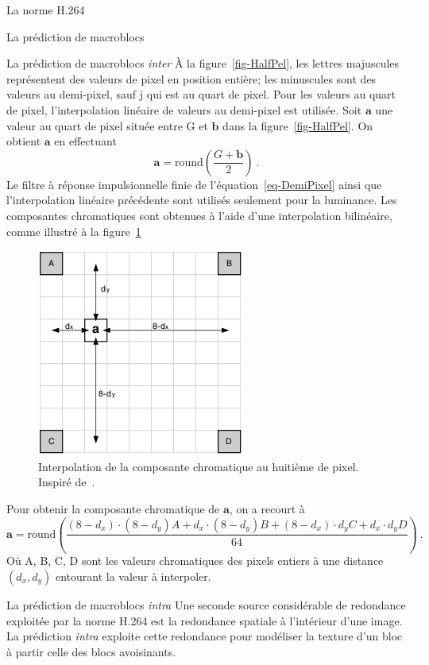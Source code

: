 \documentclass[letterpaper, twoside, 12pt,memoire]{thETS}
\newcommand{\fig}[1]{figure~\ref{#1}}
\begin{document}
\begin{chapter}{La norme H.264}
\begin{section}{La prédiction de macroblocs}
\begin{subsection}{La prédiction de macroblocs \textit{inter}}
À la figure~\ref{fig-HalfPel}, les lettres majuscules représentent des valeurs
de pixel en position entière; les minuscules sont des valeurs au demi-pixel,
sauf j qui est au quart de pixel. Pour les valeurs au quart de pixel,
l'interpolation linéaire de valeurs au demi-pixel est utilisée. Soit $\mathbf{a}$ une valeur au quart de
pixel située entre G et $\mathbf{b}$ dans la \fig{fig-HalfPel}. On obtient
$\mathbf{a}$ en effectuant
\begin{equation}
\mathbf{a} = \text{round} \left(\frac{G + \mathbf{b} }{2} \right)\:.
\end{equation}
Le filtre à réponse impulsionnelle finie de l'équation~\ref{eq-DemiPixel} ainsi
que l'interpolation linéaire précédente sont utilisés seulement pour la
luminance. Les composantes chromatiques sont obtenues à l'aide d'une
interpolation bilinéaire, comme illustré à la figure~\ref{fig-ChromaPel}

\begin{figure}[htb]
\centering
\includegraphics[width=0.5\linewidth]{images/ChromaPel.png}
\caption{Interpolation de la composante chromatique au huitième de pixel.
Inspiré de~\cite{richardson2003}.}
\label{fig-ChromaPel}
\end{figure}

Pour obtenir la composante chromatique de $\mathbf{a}$, on a recourt à
{\small\begin{equation}
\mathbf{a} = \text{round} \left( \frac{(8 - d_x) \cdot (8-d_y)A + d_x \cdot (8 -
d_y)B + (8 - d_x) \cdot d_yC + d_x \cdot d_yD}{64} \right)\:.
\end{equation}}
Où A, B, C, D sont les valeurs chromatiques des pixels entiers à une distance
$(d_x,d_y)$ entourant la valeur à interpoler.
\end{subsection}

\begin{subsection}{La prédiction de macroblocs \textit{intra}}
Une seconde source considérable de redondance exploitée par la norme H.264 est
la redondance spatiale à l'intérieur d'une image. La prédiction \textit{intra}
exploite cette redondance pour modéliser la texture d'un bloc à partir celle des
blocs avoisinants.


\end{subsection}
\end{section}
\end{chapter}
\end{document}
